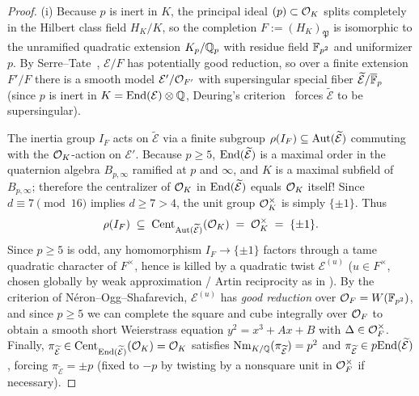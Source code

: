 \begin{proof}
(i) Because $p$ is inert in $K$, the principal ideal $(p) \subset \mathcal{O}_K$ splits completely in the Hilbert class field $H_K/K$, so the completion $F := (H_K)_{\mathfrak{P}}$ is isomorphic to the unramified quadratic extension $K_p / \mathbb{Q}_p$ with residue field $\mathbb{F}_{p^2}$ and uniformizer $p$. By Serre--Tate~\cite[Theorem~6]{SerreTate1968}, $\mathcal{E}/F$ has potentially good reduction, so over a finite extension $F'/F$ there is a smooth model $\mathcal{E}' / \mathcal{O}_{F'}$ with supersingular special fiber $\widetilde{\mathcal{E}} / \overline{\mathbb{F}}_p$ (since $p$ is inert in $K = \mathrm{End}(\mathcal{E}) \otimes \mathbb{Q}$, Deuring's criterion~\cite{Deuring1941} forces $\widetilde{\mathcal{E}}$ to be supersingular).

The inertia group $I_F$ acts on $\widetilde{\mathcal{E}}$ via a finite subgroup $\rho(I_F) \subseteq \mathrm{Aut}(\widetilde{\mathcal{E}})$ commuting with the $\mathcal{O}_K$-action on $\mathcal{E}'$. Because $p \ge 5$, $\mathrm{End}(\widetilde{\mathcal{E}})$ is a maximal order in the quaternion algebra $B_{p, \infty}$ ramified at $p$ and $\infty$, and $K$ is a maximal subfield of $B_{p, \infty}$; therefore the centralizer of $\mathcal{O}_K$ in $\mathrm{End}(\widetilde{\mathcal{E}})$ equals $\mathcal{O}_K$ itself! Since $d \equiv 7 \pmod{16}$ implies $d \ge 7 > 4$, the unit group $\mathcal{O}_K^\times$ is simply $\{\pm 1\}$. Thus
\[
  \rho(I_F) \;\subseteq\; \operatorname{Cent}_{\mathrm{Aut}(\widetilde{\mathcal{E}})}(\mathcal{O}_K) \;=\; \mathcal{O}_K^\times \;=\; \{\pm 1\}.
\]
Since $p \ge 5$ is odd, any homomorphism $I_F \to \{\pm 1\}$ factors through a tame quadratic character of $F^\times$, hence is killed by a quadratic twist $\mathcal{E}^{(u)}$ ($u \in F^\times$, chosen globally by weak approximation / Artin reciprocity as in \cite{Silverman1994}). By the criterion of N\'eron--Ogg--Shafarevich, $\mathcal{E}^{(u)}$ has \emph{good reduction} over $\mathcal{O}_F = W(\mathbb{F}_{p^2})$, and since $p \ge 5$ we can complete the square and cube integrally over $\mathcal{O}_F$ to obtain a smooth short Weierstrass equation $y^2 = x^3 + Ax + B$ with $\Delta \in \mathcal{O}_F^\times$. Finally, $\pi_{\widetilde{\mathcal{E}}} \in \operatorname{Cent}_{\mathrm{End}(\widetilde{\mathcal{E}})}(\mathcal{O}_K) = \mathcal{O}_K$ satisfies $\operatorname{Nm}_{K/\mathbb{Q}}(\pi_{\widetilde{\mathcal{E}}}) = p^2$ and $\pi_{\widetilde{\mathcal{E}}} \in p\mathrm{End}(\widetilde{\mathcal{E}})$, forcing $\pi_{\widetilde{\mathcal{E}}} = \pm p$ (fixed to $-p$ by twisting by a nonsquare unit in $\mathcal{O}_F^\times$ if necessary).


\end{proof}
